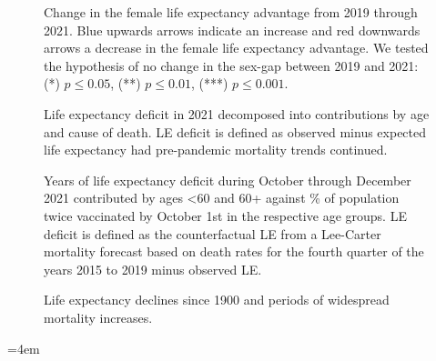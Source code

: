 \documentclass[12pt]{article}
\begin{document}
\begin{figure}[ht!]
    \centering
    \caption{Change in the female life expectancy advantage from 2019 through 2021. Blue upwards arrows indicate an increase and red downwards arrows a decrease in the female life expectancy advantage. We tested the hypothesis of no change in the sex-gap between 2019 and 2021: (*) $p\leq0.05$, (**) $p\leq0.01$, (***) $p\leq0.001$.}
    \label{fig:figure-3}
\end{figure}

\begin{figure}[ht!]
    \centering
    \caption{Life expectancy deficit in 2021 decomposed into contributions by age and cause of death. LE deficit is defined as observed minus expected life expectancy had pre-pandemic mortality trends continued.}
    \label{fig:figure-4}
\end{figure}

\begin{figure}[ht!]
    \centering
    \caption{Years of life expectancy deficit during October through December 2021 contributed by ages <60 and 60+ against \% of population twice vaccinated by October 1st in the respective age groups. LE deficit is defined as the counterfactual LE from a Lee-Carter mortality forecast based on death rates for the fourth quarter of the years 2015 to 2019 minus observed LE.}
    \label{fig:figure-5}
\end{figure}

\begin{figure}[ht!]
    \centering
    \caption{Life expectancy declines since 1900 and periods of widespread mortality increases.}
    \label{fig:figure-6}
\end{figure}

\clearpage
\emergencystretch=4em
%
\end{document}
